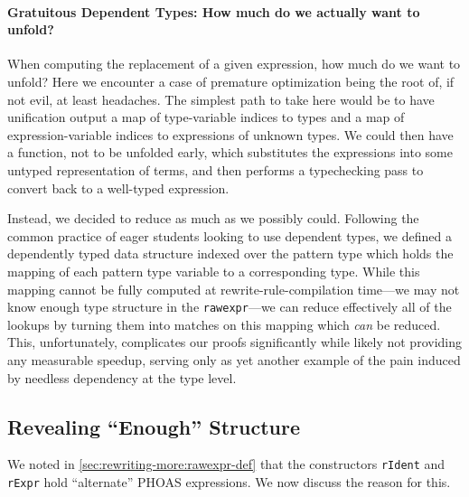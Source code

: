 \paragraph{Gratuitous Dependent Types: How much do we actually want to unfold?}
When computing the replacement of a given expression, how much do we want to unfold?
Here we encounter a case of premature optimization being the root of, if not evil, at least headaches.
The simplest path to take here would be to have unification output a map of type-variable indices to types and a map of expression-variable indices to expressions of unknown types.
We could then have a function, not to be unfolded early, which substitutes the expressions into some untyped representation of terms, and then performs a typechecking pass to convert back to a well-typed expression.

Instead, we decided to reduce as much as we possibly could.
Following the common practice of eager students looking to use dependent types, we defined a dependently typed data structure indexed over the pattern type which holds the mapping of each pattern type variable to a corresponding type.
While this mapping cannot be fully computed at rewrite-rule-compilation time---we may not know enough type structure in the \texttt{rawexpr}---we can reduce effectively all of the lookups by turning them into matches on this mapping which \emph{can} be reduced.
This, unfortunately, complicates our proofs significantly while likely not providing any measurable speedup, serving only as yet another example of the pain induced by needless dependency at the type level.


\subsection{Revealing ``Enough'' Structure}\label{sec:rewriting-more:revealing-enough-structure}
We noted in \autoref{sec:rewriting-more:rawexpr-def} that the constructors \texttt{rIdent} and \texttt{rExpr} hold ``alternate'' PHOAS expressions.
We now discuss the reason for this.

